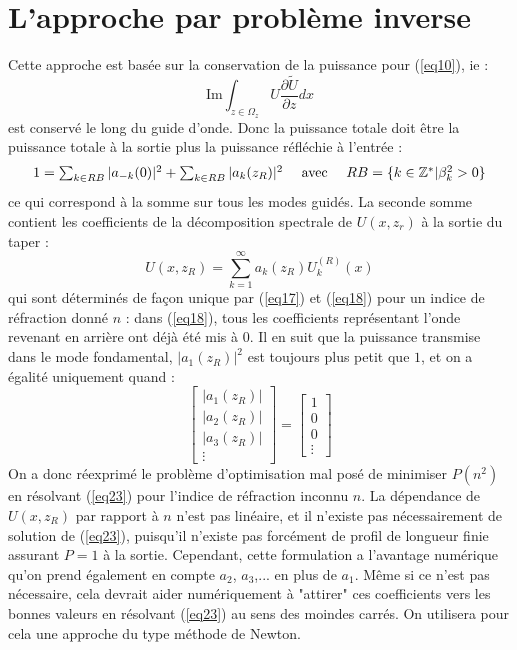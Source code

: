 \documentclass{article}
\begin{document}
\section{L'approche par problème inverse}
Cette approche est basée sur la conservation de la puissance pour (\ref{eq10}), ie :
	\[\mathrm{Im}\int_{z\in\Omega_z} U\frac{\partial \tilde{U}}{\partial z} dx\]
est conservé le long du guide d'onde. Donc la puissance totale doit être la puissance totale à la sortie plus la puissance réfléchie à l'entrée :
\[\begin{array}{l c r}
1=\sum_{k\in RB} |a_{-k}(0)|^2 + \sum_{k\in RB} |a_k(z_R)|^2 &\text{ avec }& RB=\{k\in \mathbb{Z}^* | \beta_k^2>0\}
\end{array}\]
ce qui correspond à la somme sur tous les modes guidés. La seconde somme contient les coefficients de la décomposition spectrale de $U(x,z_r)$ à la sortie du taper :
	\[U(x,z_R)=\sum_{k=1}^\infty a_k(z_R)U_k^{(R)}(x)\]
qui sont déterminés de façon unique par (\ref{eq17}) et (\ref{eq18}) pour un indice de réfraction donné $n$ : dans (\ref{eq18}), tous les coefficients représentant l'onde revenant en arrière ont déjà été mis à 0. Il en suit que la puissance transmise dans le mode fondamental, $|a_1(z_R)|^2$ est toujours plus petit que $1$, et on a égalité uniquement quand :
\begin{equation}\label{eq23}
	\begin{bmatrix} |a_1(z_R)| \\ |a_2(z_R)| \\ |a_3(z_R)| \\ \vdots \end{bmatrix} = \begin{bmatrix} 1 \\ 0 \\ 0 \\ \vdots \end{bmatrix}
\end{equation}
On a donc réexprimé le problème d'optimisation mal posé de minimiser $P(n^2)$ en résolvant (\ref{eq23}) pour l'indice de réfraction inconnu $n$. La dépendance de $U(x,z_R)$ par rapport à $n$ n'est pas linéaire, et il n'existe pas nécessairement de solution de (\ref{eq23}), puisqu'il n'existe pas forcément de profil de longueur finie assurant $P=1$ à la sortie. Cependant, cette formulation a l'avantage numérique qu'on prend également en compte $a_2$, $a_3$,... en plus de $a_1$. Même si ce n'est pas nécessaire, cela devrait aider numériquement à "attirer" ces coefficients vers les bonnes valeurs en résolvant (\ref{eq23}) au sens des moindes carrés. On utilisera pour cela une approche du type méthode de Newton.\\
\end{document}

